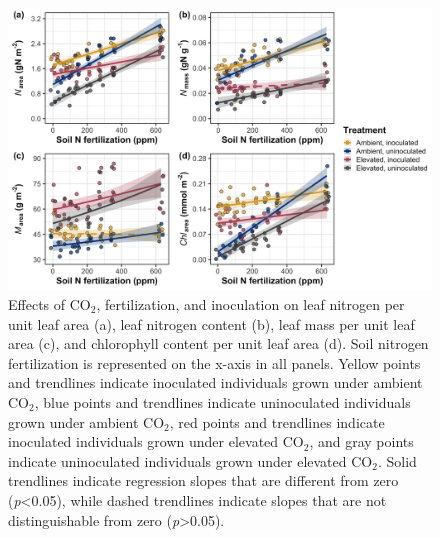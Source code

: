 \newpage
\begin{landscape}
    \begin{figure}
        \centering
        \includegraphics[width=\linewidth]{ch5_NxCO2xI/figs/NxCO2xI_fig1_leafN.png}
        \caption[Effects of CO$_2$, fertilization, and inoculation on leaf nitrogen per unit leaf area, leaf nitrogen content, leaf mass per unit leaf area, and chlorophyll content per unit leaf area]{Effects of CO$_2$, fertilization, and inoculation on leaf nitrogen per unit leaf area (a), leaf nitrogen content (b), leaf mass per unit leaf area (c), and chlorophyll content per unit leaf area (d). Soil nitrogen fertilization is represented on the x-axis in all panels. Yellow points and trendlines indicate inoculated individuals grown under ambient CO$_2$, blue points and trendlines indicate uninoculated individuals grown under ambient CO$_2$, red points and trendlines indicate inoculated individuals grown under elevated CO$_2$, and gray points indicate uninoculated individuals grown under elevated CO$_2$. Solid trendlines indicate regression slopes that are different from zero (\textit{p}<0.05), while dashed trendlines indicate slopes that are not distinguishable from zero (\textit{p}>0.05).}
        \label{fig:figure5.1}
    \end{figure}
\end{landscape}
\clearpage

